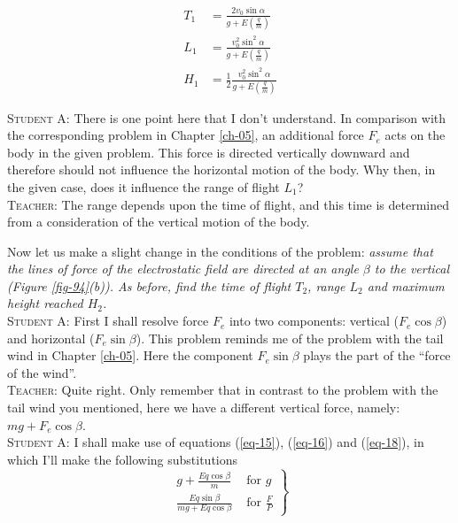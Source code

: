\documentclass[a4paper,sfsidenotes]{tufte-book}
\begin{document}
\begin{align}
T_{1} & = \frac{2 v_{0} \sin \alpha}{ g + E \left(\frac{q}{m} \right)} \label{eq-140}\\
L_{1} &= \frac{ v_{0}^{2} \sin^{2} \alpha}{g + E \left(\frac{q}{m} \right)} \label{eq-141}\\
H_{1} &=\frac{1}{2} \frac{v_{0}^{2} \sin^{2} \alpha}{g + E \left(\frac{q}{m} \right)} \label{eq-142}
\end{align} 

\textsc{Student A:} There is one point here that I don't understand. In comparison with the corresponding problem in  Chapter \ref{ch-05}, an additional force $F_{e}$ acts on the body in the given problem. This force is directed vertically downward and therefore should not influence the horizontal motion of the body. Why then, in the given case, does it influence the range of flight $L_{1}$?
\\
\textsc{Teacher:} The range depends upon the time of flight, and this time is determined from a consideration of the vertical motion of the body.

Now let us make a slight change in the conditions of the problem: \emph{assume that the lines of force of the electrostatic field are directed at an angle $\beta$ to the vertical (\emph{Figure \ref{fig-94}(b)}). As before, find the time of flight $T_{2}$, range $L_{2}$ and maximum height reached $H_{2}$.}
\\
\textsc{Student A:} First I shall resolve force $F_{e}$ into two components: vertical ($F_{e} \cos \beta$) and horizontal ($F_{e} \sin \beta$). This problem reminds me of the problem with the tail wind in Chapter \ref{ch-05}. Here the component $F_{e} \sin \beta$ plays the part of the ``force of the wind''.
\\
\textsc{Teacher:} Quite right. Only remember that in contrast to the problem with the tail wind you mentioned, here we have a different vertical force, namely: $mg + F_{e} \cos \beta$.
\\
\textsc{Student A:} I shall make use of equations (\ref{eq-15}), (\ref{eq-16}) and (\ref{eq-18}), in which I'll make the following substitutions
\begin{equation}%
\left.
\begin{split}
g + 	\frac{E q \cos \beta}{m} \,\, & \text{for} \,\, g \\
\frac{E q \sin \beta}{mg + Eq \cos \beta} \,\, & \text{for} \,\, \frac{F}{P}
\label{eq-143}
\end{split}
\right\}
\end{equation}
\end{document}
